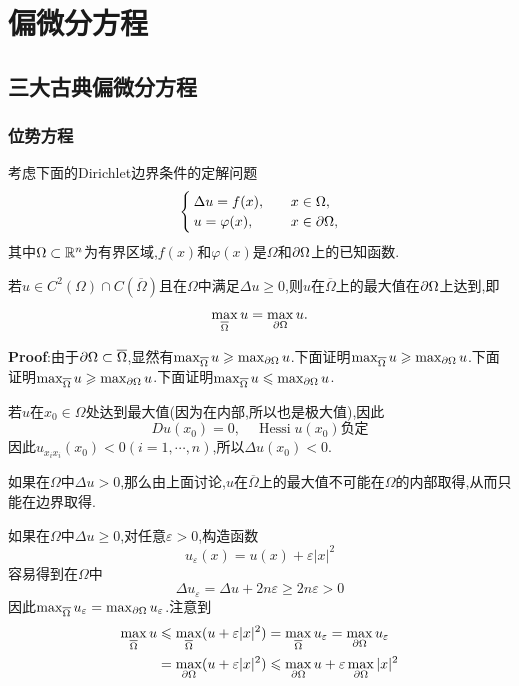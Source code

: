 \section{偏微分方程}
\subsection{三大古典偏微分方程}
\subsubsection{位势方程}
考虑下面的Dirichlet边界条件的定解问题
\begin{equation}
\begin{cases}
    \Delta u=f(x),\quad &x\in \Omega,\\
    u=\varphi(x),\quad &x\in \partial\Omega,
\end{cases}
\label{eq:2.0.2}
\end{equation}
其中$\Omega\subset\mathbb{R} ^n$为有界区域,$f(x)$和$\varphi(x)$是$\Omega$和$\partial \Omega$上的已知函数.\par
\begin{tcolorbox}[colback=KuangNei,colframe=BianKuang,title=\textbf{弱极大值原理},sharpish corners]
    若$u\in C^2(\Omega)\cap C(\overline{\Omega})$且在$\Omega$中满足$\Delta u\geqslant 0$,则$u$在$\overline{\Omega}$上的最大值在$\partial\Omega$上达到,即
    $$
    \max_{\overline{\Omega}}u=\max_{\partial\Omega}u.
    $$
\end{tcolorbox}
\textbf{Proof}:由于$\partial\Omega\subset\overline{\Omega}$,显然有$\max_{\overline{\Omega}}u\geqslant\max_{\partial\Omega}u$.下面证明$\max_{\overline{\Omega}}u\geqslant\max_{\partial\Omega}u$.下面证明$\max_{\overline{\Omega}}u\geqslant\max_{\partial\Omega}u$.下面证明$\max_{\overline{\Omega}}u\leqslant\max_{\partial\Omega}u$.\par
若$u$在$x_0\in\Omega$处达到最大值(因为在内部,所以也是极大值),因此
$$
Du(x_0)=0,\quad \operatorname{Hessi}u(x_0)\text{负定}
$$
因此$u_{x_ix_i}(x_0)<0(i=1,\cdots,n)$,所以$\Delta u(x_0)<0$.\par
如果在$\Omega$中$\Delta u>0$,那么由上面讨论,$u$在$\overline{\Omega}$上的最大值不可能在$\Omega$的内部取得,从而只能在边界取得.\par
如果在$\Omega$中$\Delta u\geqslant 0$,对任意$\varepsilon>0$,构造函数
$$
u_{\varepsilon}(x)=u(x)+\varepsilon|x|^2
$$
容易得到在$\Omega$中
$$
\Delta u_{\varepsilon}=\Delta u +2n\varepsilon\geqslant 2n\varepsilon>0
$$
因此$\max_{\overline{\Omega}}u_{\varepsilon}=\max_{\partial\Omega}u_{\varepsilon}$.注意到
$$
\begin{aligned}
    \max_{\overline{\Omega}}u &\leqslant \max_{\overline{\Omega}}(u+\varepsilon|x|^2)=\max_{\overline{\Omega}}u_{\varepsilon}=\max_{\partial\Omega}u_{\varepsilon}\\
                              &=\max_{\partial\Omega}(u+\varepsilon|x|^2)\leqslant \max_{\partial\Omega}u+\varepsilon\max_{\partial\Omega}|x|^2
\end{aligned}
$$
